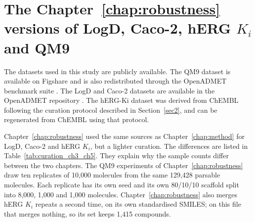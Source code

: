\section{\texorpdfstring{The Chapter~\ref{chap:robustness} versions of LogD, Caco-2, hERG $K_i$ and QM9}{The Chapter 3 versions of LogD, Caco-2, hERG Ki and QM9}}\label{app:datasets:ch3}

The datasets used in this study are publicly available. The QM9 dataset is available on Figshare \citep{qm9_dataset} and is also redistributed through the OpenADMET benchmark suite \citep{Ramakrishnan2014, openadmet}. The LogD and Caco-2 datasets are available in the OpenADMET repository \citep{openadmet}. The hERG-Ki dataset was derived from ChEMBL \citep{Zdrazil2023} following the curation protocol described in Section~\ref{sec2}, and can be regenerated from ChEMBL using that protocol.

Chapter~\ref{chap:robustness} used the same sources as Chapter~\ref{chap:method} for LogD, Caco-2 and hERG $K_i$, but a lighter curation. The differences are listed in Table~\ref{tab:curation_ch3_ch5}. They explain why the sample counts differ between the two chapters. The QM9 experiments of Chapter~\ref{chap:robustness} draw ten replicates of 10,000 molecules from the same 129,428 parsable molecules. Each replicate has its own seed and its own 80/10/10 scaffold split into 8,000, 1,000 and 1,000 molecules. Chapter~\ref{chap:robustness} also merges hERG $K_i$ repeats a second time, on its own standardised SMILES; on this file that merges nothing, so its set keeps 1,415 compounds.

